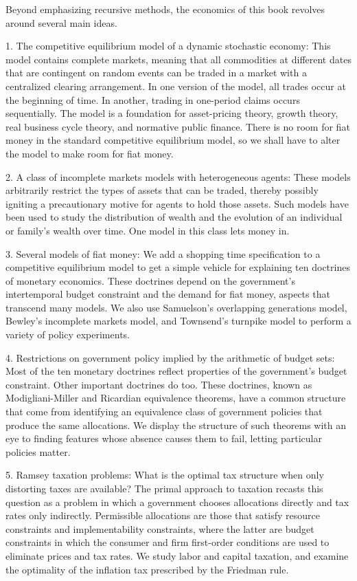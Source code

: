 \noindent Beyond emphasizing recursive  methods,
     the economics  of this book
revolves around several main  ideas.
\medskip
\item{1.}  The competitive equilibrium model of
a dynamic stochastic economy:
This model contains  complete markets, meaning
that  all commodities at different dates
that are contingent  on 
random events can be traded in a market with a centralized
clearing arrangement.  In one version of the model,
all trades occur at the beginning of time.  In another,
trading in one-period claims occurs sequentially.
The model   is a foundation for  asset-pricing theory, growth
theory, real business cycle theory, and normative
public finance.    There is no room for fiat money in
the standard competitive equilibrium model, so we
shall have to alter the model to make room for  fiat money.
\medskip
\item{2.} A class of incomplete markets models with heterogeneous
agents:  These models arbitrarily restrict the types of assets
that can be traded, thereby possibly igniting a precautionary
motive    for agents to hold those assets.    Such models
have been used to study the
distribution of wealth  and the evolution of an individual or
family's wealth over time.   One model in this class lets money in.

\medskip
\item{3.}   Several models of
fiat money:    We add a shopping time specification
to a competitive equilibrium model to get a simple vehicle
for explaining ten
  doctrines of monetary economics. These doctrines depend
on the government's intertemporal budget constraint and the demand
for fiat money, aspects that transcend many models.     We also use
Samuelson's overlapping generations model, Bewley's
incomplete markets model,  and Townsend's
turnpike model to perform a variety of policy experiments.

\medskip
\item{4.}  Restrictions on government  policy implied by the arithmetic of
budget sets:  Most of the ten monetary doctrines reflect
properties of the government's budget constraint.  Other
important doctrines do too.
These doctrines, known as Modigliani-Miller
and Ricardian equivalence theorems, have a common structure that come from
identifying an equivalence class of
government policies that produce the same allocations.
We display the structure of such theorems with an eye to
finding 
features whose absence causes them to fail, letting
particular policies matter.
\medskip
\item{5.} Ramsey taxation problems:
What is the optimal tax structure when only distorting taxes are
available? The primal approach to taxation recasts this question as a
problem in which a government chooses  allocations directly and  tax rates only indirectly. Permissible allocations are those that
satisfy resource constraints and implementability constraints, where
the latter are budget constraints in which the consumer
and firm first-order conditions are used to eliminate 
prices and tax rates. We study labor and
capital taxation, and examine the optimality of the inflation
tax prescribed by the Friedman rule.


